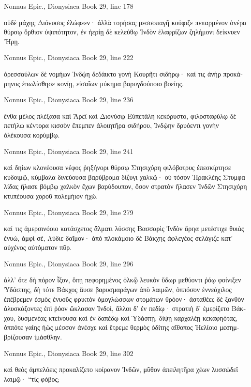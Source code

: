 \documentclass[12pt,letterpaper,twoside,final]{memoir}
\begin{document}
\begin{greek}
Nonnus Epic., Dionysiaca 
Book 29, line 178

οὐδὲ μάχης Διόνυσος ἐλώφεεν· ἀλλὰ τορήσας 
μεσσοπαγῆ κούφιζε πεπαρμένον ἀνέρα θύρσῳ 
ὄρθιον ὑψιπότητον, ἐν ἠερίῃ δὲ κελεύθῳ 
Ἰνδὸν ἐλαφρίζων ζηλήμονι δείκνυεν Ἥρῃ. 



Nonnus Epic., Dionysiaca 
Book 29, line 222

                       ὀρεσσαύλων δὲ νομήων 
Ἰνδῴη δεδάικτο γονὴ Κουρῆτι σιδήρῳ· 
καί τις ἀνὴρ προκάρηνος ἐπωλίσθησε κονίῃ, 
εἰσαΐων μύκημα βαρυγδούποιο βοείης. 



Nonnus Epic., Dionysiaca 
Book 29, line 236

ἔνθα μέλος πλέξασα καὶ Ἄρεϊ καὶ Διονύσῳ 
Εὐπετάλη κεκόρυστο, φιλοσταφύλῳ δὲ πετήλῳ 
κέντορα κισσὸν ἔπεμπεν ἀλοιητῆρα σιδήρου, 
Ἰνδῴην δρυόεντι γονὴν ὀλέκουσα κορύμβῳ. 



Nonnus Epic., Dionysiaca 
Book 29, line 241

καὶ δηίων κλονέουσα νέφος ῥηξήνορι θύρσῳ   
Στησιχόρη φιλόβοτρυς ἐπεσκίρτησε κυδοιμῷ, 
κύμβαλα δινεύουσα βαρύβρομα δίζυγι χαλκῷ· 
οὐ τόσον Ἡρακλέης Στυμφαλίδας ἤλασε βόμβῳ 
χαλκὸν ἔχων βαρύδουπον, ὅσον στρατὸν ἤλασεν Ἰνδῶν 
Στησιχόρη κτυπέουσα χοροῦ πολεμήιον ἠχώ. 



Nonnus Epic., Dionysiaca 
Book 29, line 279

καί τις ἀμερσινόοιο κατάσχετος ἅλματι λύσσης   
Βασσαρὶς Ἰνδὸν ἄρηα μετέστιχε θυιὰς ἐνυώ, 
ἀμφὶ σέ, Λύδιε δαῖμον· ἀπὸ πλοκάμοιο δὲ Βάκχης 
ἀφλεγέος σελάγιζε κατ' αὐχένος αὐτόματον πῦρ. 



Nonnus Epic., Dionysiaca 
Book 29, line 296

ἀλλ' ὅτε δὴ πόρον ἷξον, ὅπῃ πεφορημένος ὁλκῷ 
λευκὸν ὕδωρ μεθύοντι ῥόῳ φοίνιξεν Ὑδάσπης, 
δὴ τότε Βάκχος ἄυσε βαρυσμαράγων ἀπὸ λαιμῶν, 
ὁππόσον ἐννεάχιλος ἐπέβρεμεν ἐσμὸς ἐνυοῦς 
φρικτὸν ὁμογλώσσων στομάτων θρόον· ἀσταθέες δὲ 
ξανθὸν ἀλυσκάζοντες ἐπὶ ῥόον ὤκλασαν Ἰνδοί, 
ἄλλοι δ' ἐν πεδίῳ· στρατιὴ δ' ἐμερίζετο Βάκχου, 
δυσμενέας κτείνουσα καὶ ἐν δαπέδῳ καὶ Ὑδάσπῃ,   
δίψῃ καρχαλέῃ κεκαφηότας, ὁππότε γαίης 
ἠὼς μέσσον ἀνέσχε καὶ ἔτρεμε θερμὸς ὁδίτης 
αἴθοπος Ἠελίοιο μεσημβρίζουσαν ἱμάσθλην. 



Nonnus Epic., Dionysiaca 
Book 29, line 302

καὶ θεὸς ἀμπελόεις προκαλίζετο κοίρανον Ἰνδῶν, 
μῦθον ἀπειλητῆρα χέων λυσσώδεϊ λαιμῷ· 
 “τίς φόβος; 




\end{greek}
\end{document}
